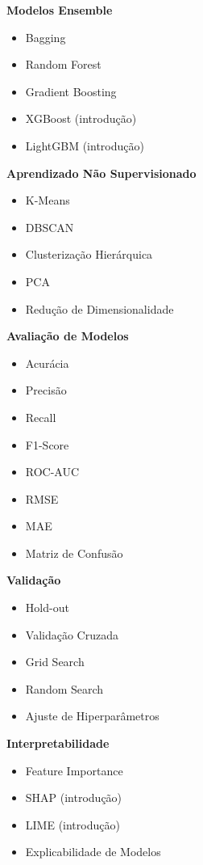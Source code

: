 \textbf{Modelos Ensemble}

\begin{itemize}
\item Bagging
\item Random Forest
\item Gradient Boosting
\item XGBoost (introdução)
\item LightGBM (introdução)
\end{itemize}

\textbf{Aprendizado Não Supervisionado}

\begin{itemize}
\item K-Means
\item DBSCAN
\item Clusterização Hierárquica
\item PCA
\item Redução de Dimensionalidade
\end{itemize}

\textbf{Avaliação de Modelos}

\begin{itemize}
\item Acurácia
\item Precisão
\item Recall
\item F1-Score
\item ROC-AUC
\item RMSE
\item MAE
\item Matriz de Confusão
\end{itemize}

\textbf{Validação}

\begin{itemize}
\item Hold-out
\item Validação Cruzada
\item Grid Search
\item Random Search
\item Ajuste de Hiperparâmetros
\end{itemize}

\textbf{Interpretabilidade}

\begin{itemize}
\item Feature Importance
\item SHAP (introdução)
\item LIME (introdução)
\item Explicabilidade de Modelos
\end{itemize}

